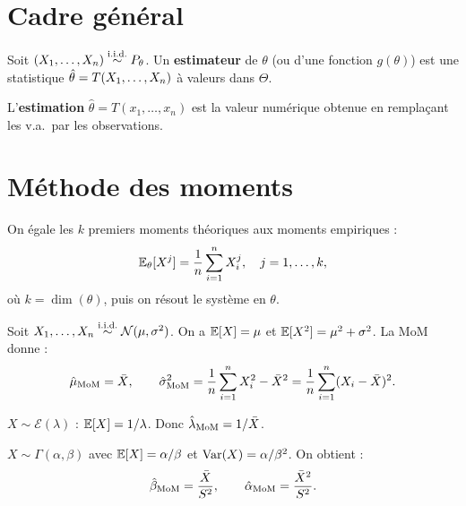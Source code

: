 \section{Cadre g\'en\'eral}

\begin{definition}[Estimateur]
Soit $(X_1,\ldots,X_n)\overset{\text{i.i.d.}}{\sim} P_\theta$. Un \textbf{estimateur} de $\theta$ (ou d'une fonction $g(\theta)$) est une statistique $\hat{\theta} = T(X_1,\ldots,X_n)$ \`a valeurs dans $\Theta$.
\end{definition}

\begin{definition}[Estimation]
L'\textbf{estimation} $\hat{\theta}=T(x_1,\ldots,x_n)$ est la valeur num\'erique obtenue en rempla\c{c}ant les v.a.\ par les observations.
\end{definition}

\section{M\'ethode des moments}
\label{sec:moments}

\begin{definition}
On \'egale les $k$ premiers moments th\'eoriques aux moments empiriques :
\[
\mathbb{E}_\theta[X^j] = \frac{1}{n}\sum_{i=1}^n X_i^j, \quad j=1,\ldots,k,
\]
o\`u $k=\dim(\theta)$, puis on r\'esout le syst\`eme en $\theta$.
\end{definition}

\begin{exemple}
Soit $X_1,\ldots,X_n\overset{\text{i.i.d.}}{\sim}\mathcal{N}(\mu,\sigma^2)$. On a $\mathbb{E}[X]=\mu$ et $\mathbb{E}[X^2]=\mu^2+\sigma^2$. La MoM donne :
\[
\hat{\mu}_{\mathrm{MoM}} = \bar{X}, \qquad \hat{\sigma}^2_{\mathrm{MoM}} = \frac{1}{n}\sum_{i=1}^n X_i^2 - \bar{X}^2 = \frac{1}{n}\sum_{i=1}^n (X_i-\bar{X})^2.
\]
\end{exemple}

\begin{exemple}
$X\sim\mathcal{E}(\lambda)$ : $\mathbb{E}[X]=1/\lambda$. Donc $\hat{\lambda}_{\mathrm{MoM}} = 1/\bar{X}$.
\end{exemple}

\begin{exemple}
$X\sim\Gamma(\alpha,\beta)$ avec $\mathbb{E}[X]=\alpha/\beta$ et $\operatorname{Var}(X)=\alpha/\beta^2$. On obtient :
\[
\hat{\beta}_{\mathrm{MoM}} = \frac{\bar{X}}{S^2}, \qquad \hat{\alpha}_{\mathrm{MoM}} = \frac{\bar{X}^2}{S^2}.
\]
\end{exemple}


